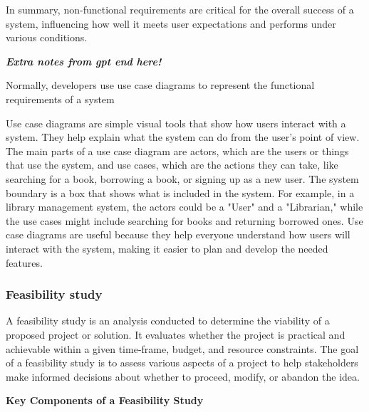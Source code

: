 \documentclass[a4paper]{article}
\begin{document}
In summary, non-functional requirements are critical for the overall success of a system, influencing how well it meets user expectations 
and performs under various conditions.

\textbf{\textit{Extra notes from gpt end here! }}

Normally, developers use use case diagrams to represent the functional requirements of a system

Use case diagrams are simple visual tools that show how users interact with a system. They help
explain what the system can do from the user's point of view. The main parts 
of a use case diagram are actors, which are the users or things that use the system, and use cases, which are the actions they can
take, like searching for a book, borrowing a book, or signing up as a new user. The system boundary is a box that shows what is included in the system. For example, in a library management system, the actors could be a "User" and a "Librarian," while the use cases might include searching for books and returning borrowed ones. Use case diagrams are useful because they help everyone understand how users will interact with the system, making it easier to plan and develop the needed features.



\subsubsection{Feasibility study}

A feasibility study is an analysis conducted to determine the viability of a proposed project or solution. It evaluates whether 
the project is practical and achievable within a given time-frame, budget, and resource constraints. The goal of a feasibility study is to
assess various aspects of a project to help stakeholders make informed decisions about whether to proceed, modify, or abandon the idea.

\textbf{Key Components of a Feasibility Study}
\end{document}
